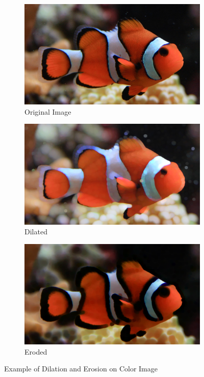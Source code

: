 \begin{figure}[ht]
    \centering
    \begin{subfigure}{0.33\textwidth}
        \centering
        \includegraphics[width=.99\linewidth]{images/literature/morphological/nemo}
        \caption{Original Image\cite{website:klovnefisk_image}}
    \end{subfigure}%
    \begin{subfigure}{.33\textwidth}
        \centering
        \includegraphics[width=.99\linewidth]{images/literature/morphological/nemo_dilate}
        \caption{Dilated}
    \end{subfigure}%
    \begin{subfigure}{.33\textwidth}
        \centering
        \includegraphics[width=.99\linewidth]{images/literature/morphological/nemo_erode}
        \caption{Eroded}
    \end{subfigure}
    \caption{Example of Dilation and Erosion on Color Image}
    \label{fig:nemo}
\end{figure}



